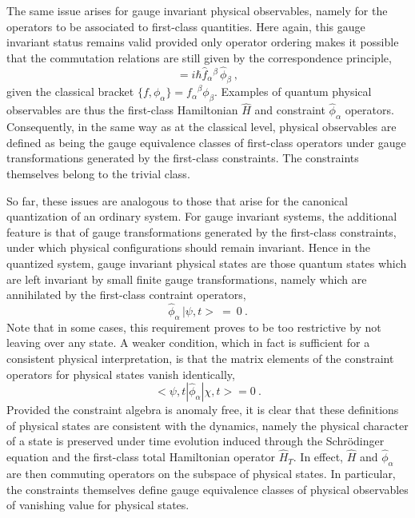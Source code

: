 \documentclass[a4paper,11pt]{article}
\begin{document}
The same issue arises for gauge invariant physical observables,
namely for the operators to be associated to first-class quantities.
Here again, this gauge invariant status remains valid provided only
operator ordering makes it possible that the commutation relations
are still given by the correspondence principle,
\begin{equation}
[\hat{f},\hat{\phi}_\alpha]=i\hbar{{\hat{f}}_\alpha}{}^\beta\,\hat{\phi}_\beta
\ ,
\end{equation}
given the classical bracket $\{f,\phi_\alpha\}={f_\alpha}^\beta\phi_\beta$.
Examples of quantum physical observables are thus the first-class
Hamiltonian $\hat{H}$ and constraint $\hat{\phi}_\alpha$ operators.
Consequently, in the same way as at the classical level, physical 
obser\-va\-bles are defined as being the gauge equivalence classes of 
first-class operators under gauge transformations generated by the first-class
constraints. The constraints themselves belong to the trivial class.

So far, these issues are analogous to those that arise for the
canonical quantization of an ordinary system. For gauge invariant systems,
the additional feature is that of gauge transformations generated by the
first-class constraints, under which physical configurations should remain
invariant. Hence in the quantized system, gauge invariant physical states
are those quantum states which are left invariant by small finite gauge
transformations, namely which are annihilated by the first-class
contraint operators,
\begin{equation}
\hat{\phi}_\alpha\,|\psi,t>\ =\ 0\ .
\end{equation}
Note that in some cases, this requirement proves to be too restrictive
by not leaving over any state. A weaker condition, which in fact is
sufficient for a consistent physical interpretation, is that the
matrix elements of the constraint operators for physical states vanish
identically,
\begin{equation}
<\psi,t|\hat{\phi}_\alpha|\chi,t>=0\ .
\end{equation}
Provided the constraint algebra is anomaly free, it is clear that these
definitions of physical states are consistent with the dynamics, namely
the physical character of a state is preserved under time evolution induced
through the Schr\"odinger equation and the first-class total Hamiltonian
operator $\hat{H}_T$. In effect, $\hat{H}$ and $\hat{\phi}_\alpha$
are then commuting operators on the subspace of physical states.
In particular, the constraints themselves define gauge equivalence classes
of physical observables of vanishing value for physical states.
\end{document}
